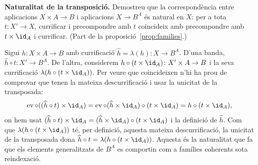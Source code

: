\begin{exercici}
\textbf{Naturalitat de la transposició.} Demostreu que la correspondència entre aplicacions \(X\times A\to B\) i aplicacions \(X\to B^A\) és natural en \(X\): per a tota \(t\colon X'\to X\), currificar i precompondre amb \(t\) coincideix amb precompondre amb \(t\times\id_A\) i currificar. (Part de la proposició~\ref{prop:families}.)
\end{exercici}
\begin{solucio}
Sigui \(h\colon X\times A\to B\) amb currificació \(\widehat h=\lambda(h)\colon X\to B^A\). D'una banda, \(\widehat h\circ t\colon X'\to B^A\). De l'altra, considerem \(h\circ(t\times\id_A)\colon X'\times A\to B\) i la seva currificació \(\lambda(h\circ(t\times\id_A))\). Per veure que coincideixen n'hi ha prou de comprovar que tenen la mateixa descurrificació i usar la unicitat de la transposada:
\[
\operatorname{ev}\circ((\widehat h\circ t)\times\id_A)=\operatorname{ev}\circ(\widehat h\times\id_A)\circ(t\times\id_A)=h\circ(t\times\id_A),
\]
on hem usat \((\widehat h\circ t)\times\id_A=(\widehat h\times\id_A)\circ(t\times\id_A)\) i la definició de \(\widehat h\). Com que \(\lambda(h\circ(t\times\id_A))\) té, per definició, aquesta mateixa descurrificació, la unicitat de la transposada dona \(\widehat h\circ t=\lambda(h\circ(t\times\id_A))\). Aquesta és la naturalitat que fa que els elements generalitzats de \(B^A\) es comportin com a famílies coherents sota reindexació.
\end{solucio}
